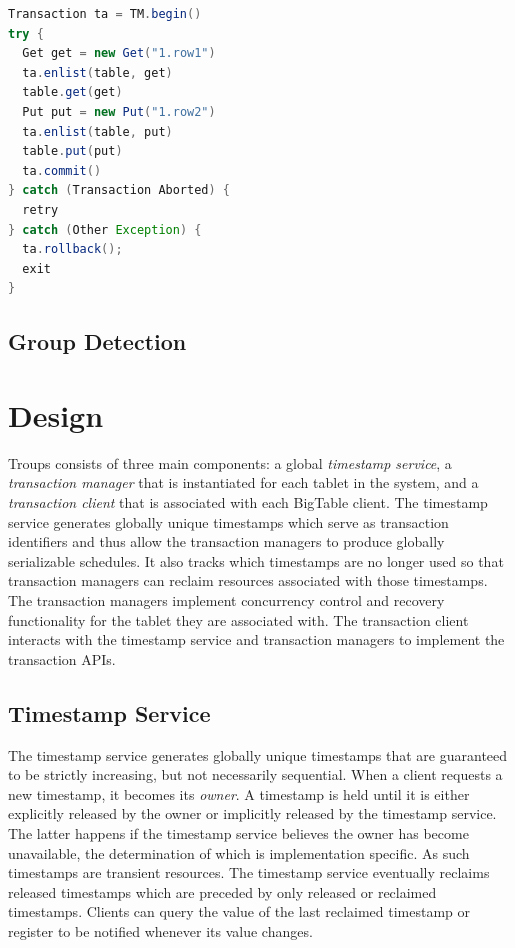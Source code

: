 \documentclass[10pt,final,journal]{IEEEtran}
\begin{document}
\begin{lstlisting}[language=Java,caption=Group Transaction Syntax,float,label=tran,emph={begin,enlist,commit,rollback},emphstyle=\underbar]
Transaction ta = TM.begin()
try {
  Get get = new Get("1.row1")
  ta.enlist(table, get)
  table.get(get)
  Put put = new Put("1.row2")
  ta.enlist(table, put)
  table.put(put)
  ta.commit()
} catch (Transaction Aborted) {
  retry
} catch (Other Exception) {
  ta.rollback();
  exit
}
\end{lstlisting}

\subsection{Group Detection}

\section{Design}
Troups consists of three main components: a global \emph{timestamp service}, a \emph{transaction manager} that is instantiated for each tablet in the system, and a \emph{transaction client} that is associated with each BigTable client. The timestamp service generates globally unique timestamps which serve as transaction identifiers and thus allow the transaction managers to produce globally serializable schedules. It also tracks which timestamps are no longer used so that transaction managers can reclaim resources associated with those timestamps. The transaction managers implement concurrency control and recovery functionality for the tablet they are associated with. The transaction client interacts with the timestamp service and transaction managers to implement the transaction APIs.

\subsection{Timestamp Service}
The timestamp service generates globally unique timestamps that are guaranteed to be strictly increasing, but not necessarily sequential. When a client requests a new timestamp, it becomes its \emph{owner}. A timestamp is held until it is either explicitly released by the owner or implicitly released by the timestamp service. The latter happens if the timestamp service believes the owner has become unavailable, the determination of which is implementation specific. As such timestamps are transient resources. The timestamp service eventually reclaims released timestamps which are preceded by only released or reclaimed timestamps. Clients can query the value of the last reclaimed timestamp or register to be notified whenever its value changes.
\end{document}
